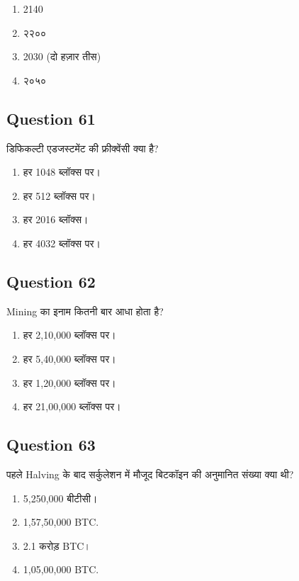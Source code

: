 \documentclass[12pt,a4paper]{article}
\begin{document}
\begin{enumerate}[label=\Alph*., leftmargin=*]
\item 2140
\item २२००
\item 2030 (दो हज़ार तीस)
\item २०५०
\end{enumerate}

\bigskip


\subsection*{Question 61}
डिफिकल्टी एडजस्टमेंट की फ्रीक्वेंसी क्या है?

\begin{enumerate}[label=\Alph*., leftmargin=*]
\item हर 1048 ब्लॉक्स पर।
\item हर 512 ब्लॉक्स पर।
\item हर 2016 ब्लॉक्स।
\item हर 4032 ब्लॉक्स पर।
\end{enumerate}

\bigskip


\subsection*{Question 62}
Mining का इनाम कितनी बार आधा होता है?

\begin{enumerate}[label=\Alph*., leftmargin=*]
\item हर 2,10,000 ब्लॉक्स पर।
\item हर 5,40,000 ब्लॉक्स पर।
\item हर 1,20,000 ब्लॉक्स पर।
\item हर 21,00,000 ब्लॉक्स पर।
\end{enumerate}

\bigskip


\subsection*{Question 63}
पहले Halving के बाद सर्कुलेशन में मौजूद बिटकॉइन की अनुमानित संख्या क्या थी?

\begin{enumerate}[label=\Alph*., leftmargin=*]
\item 5,250,000 बीटीसी।
\item 1,57,50,000 BTC.
\item 2.1 करोड़ BTC।
\item 1,05,00,000 BTC.
\end{enumerate}
\end{document}
